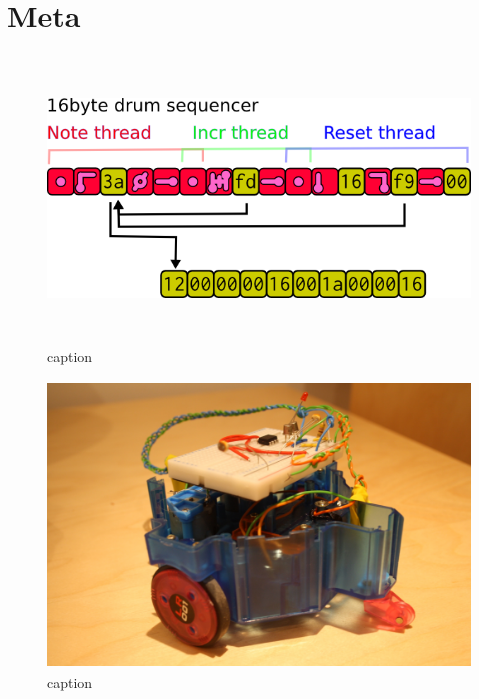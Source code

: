 \documentclass[letterpaper, 12pt]{article}
\begin{document}
\section{Meta}
\label{sec:meta}


\begin{figure}
	\centering
		\includegraphics[height=3in]{bbds-seq}
	\caption{caption}
	\label{fig:fig_bbds-seq}
\end{figure}


\begin{figure}
	\centering
		\includegraphics[height=3in]{bbbot}
	\caption{caption}
	\label{fig:fig_bbbot}
\end{figure}





\vspace*{24pt}





\vspace*{24pt}
\end{document}

